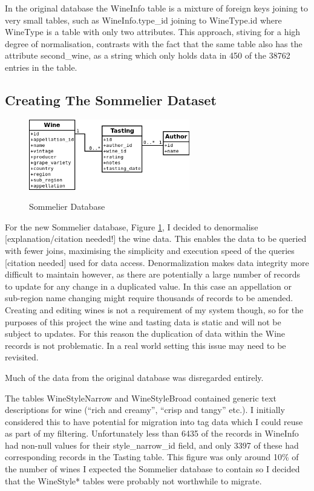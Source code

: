 In the original database the WineInfo table is a mixture of foreign keys joining to very small tables, such as WineInfo.type\_id joining to WineType.id where WineType is a table with only two attributes. This approach, stiving for a high degree of normalisation, contrasts with the fact that the same table also has the attribute second\_wine, as a string which only holds data in 450 of the 38762 entries in the table.

\subsection{Creating The Sommelier Dataset}

\begin{figure}[h!]
    \caption{Sommelier Database}
    \centering
        \includegraphics[width=7cm]{SommelierDBSimple}
    \label{fig:sommelierdb}
\end{figure}

For the new Sommelier database, Figure \ref{fig:sommelierdb}, I decided to denormalise [explanation/citation needed!] the wine data. This enables the data to be queried with fewer joins, maximising the simplicity and execution speed of the queries [citation needed] used for data access. Denormalization makes data integrity more difficult to maintain however, as there are potentially a large number of records to update for any change in a duplicated value. In this case an appellation or sub-region name changing might require thousands of records to be amended. Creating and editing wines is not a requirement of my system though, so for the purposes of this project the wine and tasting data is static and will not be subject to updates. For this reason the duplication of data within the Wine records is not problematic. In a real world setting this issue may need to be revisited.

Much of the data from the original database was disregarded entirely.

The tables WineStyleNarrow and WineStyleBroad contained generic text descriptions for wine (``rich and creamy'', ``crisp and tangy'' etc.). I initially considered this to have potential for migration into tag data which I could reuse as part of my filtering. Unfortunately less than 6435 of the records in WineInfo had non-null values for their style\_narrow\_id field, and only 3397 of these had corresponding records in the Tasting table. This figure was only around 10\% of the number of wines I expected the Sommelier database to contain so I decided that the WineStyle* tables were probably not worthwhile to migrate.

